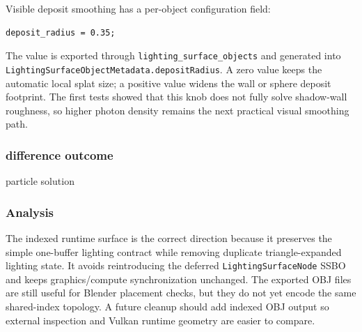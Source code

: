 Visible deposit smoothing has a per-object configuration field:
\begin{verbatim}
deposit_radius = 0.35;
\end{verbatim}
The value is exported through \texttt{lighting\_surface\_objects} and generated
into \texttt{LightingSurfaceObjectMetadata.depositRadius}.  A zero value keeps
the automatic local splat size; a positive value widens the wall or sphere
deposit footprint.  The first tests showed that this knob does not fully solve
shadow-wall roughness, so higher photon density remains the next practical
visual smoothing path.

\subsubsection{difference outcome}

particle solution

\subsubsection{Analysis}

The indexed runtime surface is the correct direction because it preserves the
simple one-buffer lighting contract while removing duplicate triangle-expanded
lighting state.  It avoids reintroducing the deferred
\texttt{LightingSurfaceNode} SSBO and keeps graphics/compute synchronization
unchanged.  The exported OBJ files are still useful for Blender placement
checks, but they do not yet encode the same shared-index topology.  A future
cleanup should add indexed OBJ output so external inspection and Vulkan
runtime geometry are easier to compare.
